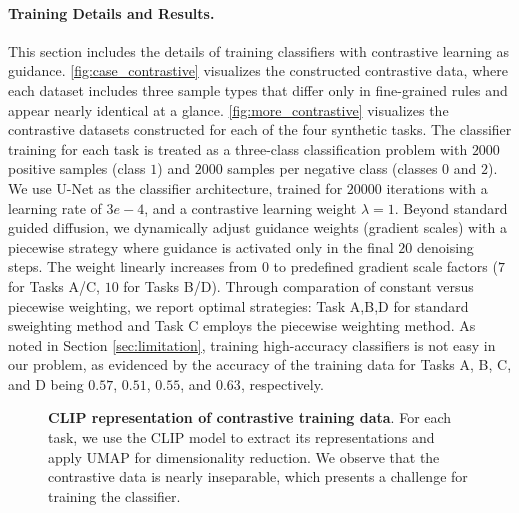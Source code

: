 \paragraph{Training Details and Results.} This section includes the details of training classifiers with contrastive learning as guidance. \cref{fig:case_contrastive} visualizes the constructed contrastive data, where each dataset includes three sample types that differ only in fine-grained rules and appear nearly identical at a glance. \cref{fig:more_contrastive} visualizes the contrastive datasets constructed for each of the four synthetic tasks. The classifier training for each task is treated as a three-class classification problem with $2000$ positive samples (class $1$) and $2000$ samples per negative class (classes $0$ and $2$). We use U-Net as the classifier architecture, trained for $20000$ iterations with a learning rate of $3e-4$, and a contrastive learning weight $\lambda = 1$. Beyond standard guided diffusion, we dynamically adjust guidance weights (gradient scales) with a piecewise strategy where guidance is activated only in the final $20$ denoising steps. The weight linearly increases from $0$ to predefined gradient scale factors ($7$ for Tasks A/C, $10$ for Tasks B/D). Through comparation of constant versus piecewise weighting, we report optimal strategies: Task A,B,D for standard sweighting method and Task C employs the piecewise weighting method. As noted in Section \ref{sec:limitation}, training high-accuracy classifiers is not easy in our problem, as evidenced by the accuracy of the training data for Tasks A, B, C, and D being $0.57$, $0.51$, $0.55$, and $0.63$, respectively.
\begin{figure*}[]
\centering
    \hfill
    \hfill
    \hfill
    \hfill
    \hfill
\vspace{-0.1in}
\caption{\textbf{CLIP representation of contrastive training data}. For each task, we use the CLIP model to extract its representations and apply UMAP for dimensionality reduction. We observe that the contrastive data is nearly inseparable, which presents a challenge for training the classifier.}
\vspace{-0.15in}
\label{fig:more_contrastive_clip}
\end{figure*}
